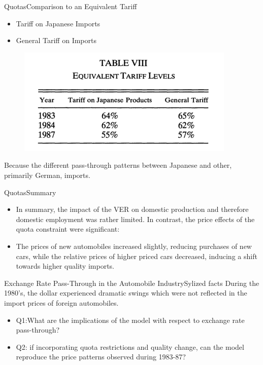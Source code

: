 \documentclass{beamer}
\begin{document}
\begin{frame}{Quotas}{Comparison to an Equivalent Tariff}

   \begin{itemize}
	   \item Tariff on Japanese Imports
	   \item General Tariff on Imports
	  
	 \end{itemize}

   \begin{figure}[h]
	   \centering          			
	   \includegraphics[scale=1.2]{table8.png}
	   \end{figure} 

   Because the different pass-through patterns between Japanese and other, primarily German, imports.
\end{frame}	


\begin{frame}{Quotas}{Summary}
	\begin{itemize}
		\item In summary, the impact of the VER on domestic production and therefore domestic employment was rather limited. In contrast, the price effects of the quota constraint were significant:
		\item The prices of new automobiles increased slightly, reducing purchases of new cars, while the relative prices of higher priced cars decreased, inducing a shift towards higher quality imports.
	\end{itemize}
\end{frame}	


\begin{frame}{Exchange Rate Pass-Through in the Automobile Industry}{Sylized facts}
	During the 1980's, the dollar experienced dramatic swings which were not reflected in the import prices of foreign automobiles.

   \begin{itemize}
	   \item Q1:What are the implications of the model with respect to exchange rate pass-through?
	   
	   \item Q2: if incorporating quota restrictions and quality change, can the model reproduce the price patterns observed during
	   1983-87?
	\end{itemize}

\end{frame}	
\end{document}
